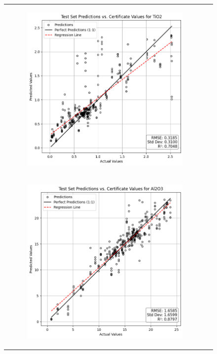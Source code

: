\begin{figure}
{\begin{tabular}{cc}
\begin{subfigure}{0.5\textwidth}
                \includegraphics[width=\textwidth]{images/one_to_one/enetalpha01/TiO2.png}
            \end{subfigure} \\
            \begin{subfigure}{0.5\textwidth}
                \includegraphics[width=\textwidth]{images/one_to_one/enetalpha01/Al2O3.png}

\end{subfigure}
\end{tabular}}
\end{figure}
